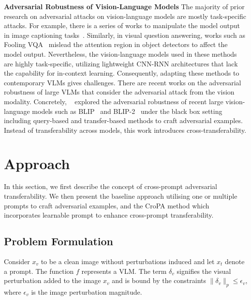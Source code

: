 \noindent\textbf{Adversarial Robustness of Vision-Language Models} The majority of prior research on adversarial attacks on vision-language models are mostly task-specific attacks. For example, there is a series of works to manipulate the model output in image captioning tasks~\citep{xu2019exact-cap-attack,zhang2020fooled-cap-attack,aafaq2021controlled,chen2017attacking}. Similarly, in visual question answering, works such as Fooling VQA~\citep{xu2018fooling,kaushik2021efficacy,kovatchev2022longhorns,li2021adversarial,sheng2021human,zhang2022towards} mislead the attention region in object detectors to affect the model output. Nevertheless, the vision-language models used in these methods are highly task-specific, utilizing lightweight CNN-RNN architectures that lack the capability for in-context learning. Consequently, adapting these methods to contemporary VLMs gives challenges. There are recent works on the adversarial robustness of large VLMs that consider the adversarial attack from the vision modality. Concretely, ~\cite{zhao2023evaluating-vlm-robustness} explored the adversarial robustness of recent large vision-language models such as BLIP~\citep{li2022blip} and BLIP-2~\citep{li2023blip} under the black box setting including query-based and transfer-based methods to craft adversarial examples. Instead of transferability across models, this work introduces cross-transferability.

\section{Approach}
In this section, we first describe the concept of cross-prompt adversarial transferability. We then present the 
baseline approach utilising one or multiple prompts to craft adversarial examples, and the CroPA method which incorporates learnable prompt to enhance cross-prompt transferability.   

\subsection{Problem Formulation}

Consider \( x_v \) to be a clean image without perturbations induced and let \( x_t \) denote a prompt. The function \( f \) represents a VLM. The term \( \delta_v \) signifies the visual perturbation added to the image \( x_v \) and is bound by the constraints \( \|\delta_v\|_p \leq \epsilon_v \), where $\epsilon_v$ is the image perturbation magnitude.

